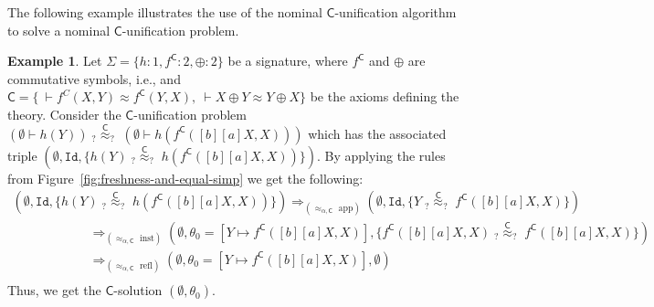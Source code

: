 \documentclass[11pt,a4paper]{amsart}
\newcommand{\caleq}{\approx_{\alpha,\theory{C}}}
\newcommand{\theory}[1]{\ensuremath{\mathsf{#1}}}
\theoremstyle{plain}
\theoremstyle{definition}
\newtheorem{example}{Example}[section]
\theoremstyle{remark}
\begin{document}

The following example illustrates the use of the nominal \theory{C}-unification algorithm to solve a nominal \theory{C}-unification problem.

\begin{example}\label{ex:c-unification} Let $\Sigma = \{h:1, f^\theory{C}:2, \oplus: 2\}$ be a signature, where $f^\theory{C}$ and $\oplus$ are commutative symbols, i.e., and $\theory{C} =\{ \ \vdash f^C(X,Y) \approx f^\theory{C}(Y,X), \ \vdash X\oplus Y \approx Y\oplus X\}$ be the axioms defining the theory. Consider the \theory{C}-unification problem
     $(\emptyset \vdash h(Y)) \; _?{\overset{\theory{C}}{\approx}}_? \; (\emptyset \vdash h(f^\theory{C}([b][a]X,X)))$  which has the associated triple $(\emptyset, \mathtt{Id}, \{h(Y) \; _?{\overset{\theory{C}}{\approx}}_? \; h(f^\theory{C}([b][a]X,X))\})$. By applying the rules from Figure~\ref{fig:freshness-and-equal-simp} we get the following:
{\small
$$
\begin{array}{l}
    (\emptyset, \mathtt{Id}, \{h(Y) \; _?{\overset{\theory{C}}{\approx}}_? \; h(f^\theory{C}([b][a]X,X))\})  
    \Longrightarrow_{(\caleq \text{\ app})}  (\emptyset, \mathtt{Id}, \{Y \; _?{\overset{\theory{C}}{\approx}}_? \; f^\theory{C}([b][a]X,X)\}) \\
    \qquad \qquad \qquad \Longrightarrow_{(\caleq \text{\ inst})}  (\emptyset, \theta_0 = [Y\mapsto f^\theory{C}([b][a]X,X)], \{f^\theory{C}([b][a]X,X) \; _?{\overset{\theory{C}}{\approx}}_? \; f^\theory{C}([b][a]X,X)\})  \\
    \qquad \qquad \qquad \Longrightarrow_{(\caleq \text{\ refl})}  (\emptyset, \theta_0 = [Y\mapsto f^\theory{C}([b][a]X,X)], \emptyset)\\
\end{array}
$$
}
Thus, we get the \theory{C}-solution $(\emptyset, \theta_0)$.



\end{example}
\end{document}
